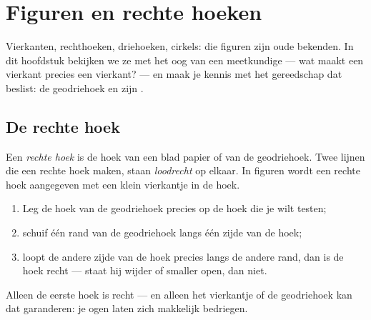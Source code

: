 \chapter{Figuren en rechte hoeken}\label{ch:g3:shapes}

Vierkanten, rechthoeken, driehoeken, cirkels: die figuren zijn oude
bekenden. In dit hoofdstuk bekijken we ze met het oog van een meetkundige
--- wat maakt een vierkant precies een vierkant? --- en maak je kennis
met het gereedschap dat beslist: de geodriehoek en zijn .

\section{De rechte hoek}

\begin{definition}\label{def:g3:shapes:rightangle}
Een \emph{rechte hoek} is de hoek van een blad papier
of van de geodriehoek. Twee lijnen die een rechte hoek maken, staan
\emph{loodrecht} op elkaar. In figuren wordt een rechte hoek aangegeven
met een klein vierkantje in de hoek.
\end{definition}

\begin{method}\label{met:g3:shapes:check}
\begin{enumerate}
  \item Leg de hoek van de geodriehoek precies op de hoek die je wilt
        testen;
  \item schuif één rand van de geodriehoek langs één zijde van de hoek;
  \item loopt de andere zijde van de hoek precies langs de andere rand,
        dan is de hoek recht --- staat hij wijder of smaller open, dan
        niet.
\end{enumerate}
\end{method}

\begin{omfigure}

{\small Alleen de eerste hoek is recht --- en alleen het vierkantje of de
geodriehoek kan dat garanderen: je ogen laten zich makkelijk bedriegen.}
\end{omfigure}

